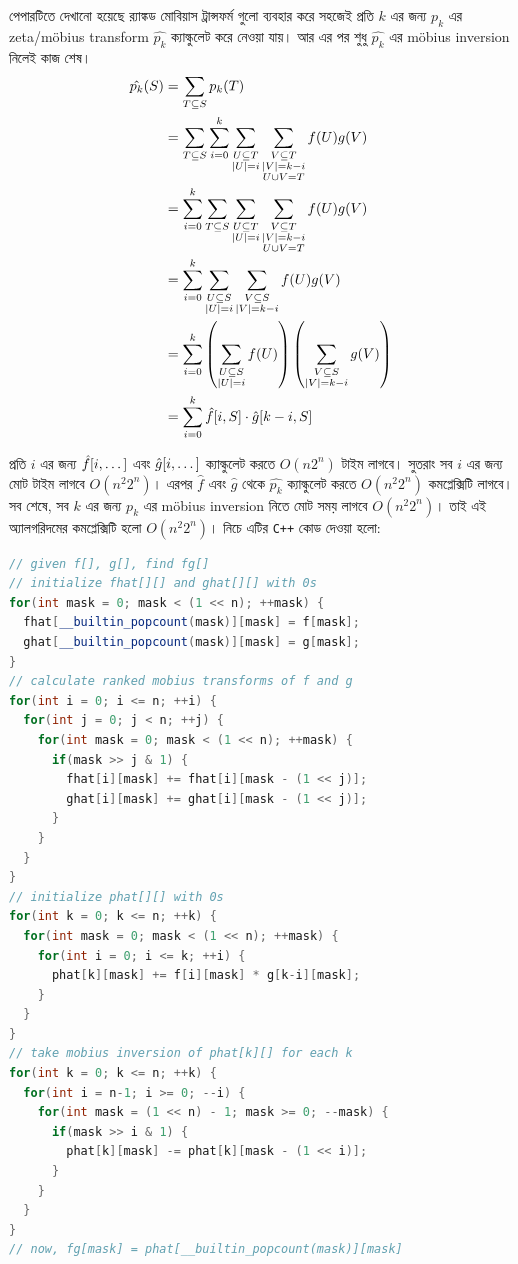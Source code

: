 পেপারটিতে দেখানো হয়েছে র‍্যাঙ্কড মোবিয়াস ট্রান্সফর্ম গুলো ব্যবহার করে সহজেই
প্রতি $k$ এর জন্য $p_k$ এর zeta/m{\"o}bius transform $\hat{p_k}$ ক্যাল্কুলেট
করে নেওয়া যায়। আর এর পর শুধু $\hat{p_k}$ এর m{\"o}bius inversion নিলেই কাজ
শেষ।
\begin{align*}
  \hat{p_k}(S) &= \sum_{T \subseteq S} p_k(T)\\
  &= \sum_{T \subseteq S} \sum_{i=0}^{k} \sum_{\substack{U \subseteq
  T\\|U|=i}} \sum_{\substack{V \subseteq T\\|V|=k-i\\U \cup V = T}} f(U)
  g(V)\\
  &= \sum_{i=0}^{k} \sum_{T \subseteq S} \sum_{\substack{U \subseteq
  T\\|U|=i}} \sum_{\substack{V \subseteq T\\|V|=k-i\\U \cup V = T}} f(U)
  g(V)\\
  &= \sum_{i=0}^{k} \sum_{\substack{U \subseteq S\\|U| = i}}
  \sum_{\substack{V \subseteq S\\|V|=k-i}} f(U) g(V)\\
  &= \sum_{i=0}^{k} \left ( \sum_{\substack{U \subseteq S\\|U| = i}} f(U) \right )
  \left ( \sum_{\substack{V \subseteq S\\|V|=k-i}} g(V) \right )\\
  &= \sum_{i=0}^{k} \hat{f}[i, S] \cdot \hat{g}[k-i, S]
\end{align*}

প্রতি $i$ এর জন্য $\hat{f}[i, \dots]$ এবং $\hat{g}[i, \dots]$
ক্যাল্কুলেট করতে $O(n 2^n)$ টাইম লাগবে। সুতরাং সব $i$ এর জন্য মোট টাইম লাগবে
$O(n^2 2^n)$। এরপর $\hat{f}$ এবং $\hat{g}$ থেকে $\hat{p_k}$ ক্যাল্কুলেট করতে
$O(n^2 2^n)$ কমপ্লেক্সিটি লাগবে। সব শেষে, সব $k$ এর জন্য $p_k$ এর m{\"o}bius
inversion নিতে মোট সময় লাগবে $O(n^2 2^n)$। তাই এই অ্যালগরিদমের কমপ্লেক্সিটি
হলো $O(n^2 2^n)$। নিচে এটির \texttt{C++} কোড দেওয়া হলো:
\begin{lstlisting}[language=C++]
// given f[], g[], find fg[]
// initialize fhat[][] and ghat[][] with 0s
for(int mask = 0; mask < (1 << n); ++mask) {
  fhat[__builtin_popcount(mask)][mask] = f[mask];
  ghat[__builtin_popcount(mask)][mask] = g[mask];
}
// calculate ranked mobius transforms of f and g
for(int i = 0; i <= n; ++i) {
  for(int j = 0; j < n; ++j) {
    for(int mask = 0; mask < (1 << n); ++mask) {
      if(mask >> j & 1) {
        fhat[i][mask] += fhat[i][mask - (1 << j)];
        ghat[i][mask] += ghat[i][mask - (1 << j)];
      }
    }
  }
}
// initialize phat[][] with 0s
for(int k = 0; k <= n; ++k) {
  for(int mask = 0; mask < (1 << n); ++mask) {
    for(int i = 0; i <= k; ++i) {
      phat[k][mask] += f[i][mask] * g[k-i][mask];
    }
  }
}
// take mobius inversion of phat[k][] for each k
for(int k = 0; k <= n; ++k) {
  for(int i = n-1; i >= 0; --i) {
    for(int mask = (1 << n) - 1; mask >= 0; --mask) {
      if(mask >> i & 1) {
        phat[k][mask] -= phat[k][mask - (1 << i)];
      }
    }
  }
}
// now, fg[mask] = phat[__builtin_popcount(mask)][mask]
\end{lstlisting}

